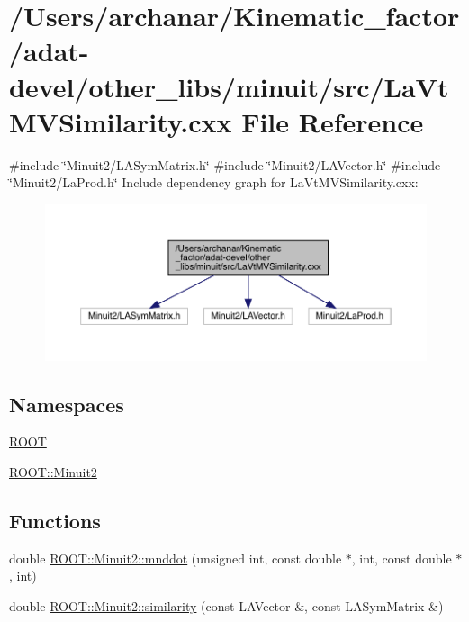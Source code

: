 \hypertarget{adat-devel_2other__libs_2minuit_2src_2LaVtMVSimilarity_8cxx}{}\section{/\+Users/archanar/\+Kinematic\+\_\+factor/adat-\/devel/other\+\_\+libs/minuit/src/\+La\+Vt\+M\+V\+Similarity.cxx File Reference}
\label{adat-devel_2other__libs_2minuit_2src_2LaVtMVSimilarity_8cxx}
{\ttfamily \#include \char`\"{}Minuit2/\+L\+A\+Sym\+Matrix.\+h\char`\"{}}\newline
{\ttfamily \#include \char`\"{}Minuit2/\+L\+A\+Vector.\+h\char`\"{}}\newline
{\ttfamily \#include \char`\"{}Minuit2/\+La\+Prod.\+h\char`\"{}}\newline
Include dependency graph for La\+Vt\+M\+V\+Similarity.\+cxx\+:
\nopagebreak
\begin{figure}[H]
\begin{center}
\leavevmode
\includegraphics[width=350pt]{d5/d12/adat-devel_2other__libs_2minuit_2src_2LaVtMVSimilarity_8cxx__incl}
\end{center}
\end{figure}
\subsection*{Namespaces}
\begin{DoxyCompactItemize}
\item 
 \mbox{\hyperlink{namespaceROOT}{R\+O\+OT}}
\item 
 \mbox{\hyperlink{namespaceROOT_1_1Minuit2}{R\+O\+O\+T\+::\+Minuit2}}
\end{DoxyCompactItemize}
\subsection*{Functions}
\begin{DoxyCompactItemize}
\item 
double \mbox{\hyperlink{namespaceROOT_1_1Minuit2_a2226faf256d69bf5b922caad1380c34e}{R\+O\+O\+T\+::\+Minuit2\+::mnddot}} (unsigned int, const double $\ast$, int, const double $\ast$, int)
\item 
double \mbox{\hyperlink{namespaceROOT_1_1Minuit2_aa54e0f1ba5ca00da1b32710322034fee}{R\+O\+O\+T\+::\+Minuit2\+::similarity}} (const L\+A\+Vector \&, const L\+A\+Sym\+Matrix \&)
\end{DoxyCompactItemize}
